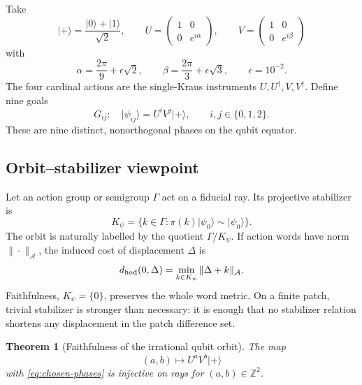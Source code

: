 \documentclass[11pt]{article}
\newtheorem{theorem}{Theorem}[section]
\theoremstyle{definition}
\theoremstyle{remark}
\newcommand{\Z}{\mathbb Z}
\newcommand{\ket}[1]{\lvert #1\rangle}
\begin{document}
Take
\begin{equation}
 \ket{+}=\frac{\ket0+\ket1}{\sqrt2},\qquad
 U=\begin{pmatrix}1&0\\0&e^{i\alpha}\end{pmatrix},\qquad
 V=\begin{pmatrix}1&0\\0&e^{i\beta}\end{pmatrix}
 \label{eq:qubit-controls}
\end{equation}
with
\begin{equation}
 \alpha=\frac{2\pi}{9}+\epsilon\sqrt2,\qquad
 \beta=\frac{2\pi}{3}+\epsilon\sqrt3,\qquad
 \epsilon=10^{-2}.
 \label{eq:chosen-phases}
\end{equation}
The four cardinal actions are the single-Kraus instruments
$U,U^\dagger,V,V^\dagger$. Define nine goals
\begin{equation}
 G_{ij}:\quad
 \ket{\psi_{ij}}=U^iV^j\ket+,\qquad i,j\in\{0,1,2\}.
 \label{eq:nine-qubit-goals}
\end{equation}
These are nine distinct, nonorthogonal phases on the qubit equator.

\subsection{Orbit--stabilizer viewpoint}

Let an action group or semigroup $\Gamma$ act on a fiducial ray. Its
projective stabilizer is
\begin{equation}
 K_\psi=\{k\in\Gamma:\pi(k)\ket{\psi_0}\sim\ket{\psi_0}\}.
 \label{eq:stabilizer}
\end{equation}
The orbit is naturally labelled by the quotient $\Gamma/K_\psi$. If action
words have norm $\|\cdot\|_{\mathcal A}$, the induced cost of displacement
$\Delta$ is
\begin{equation}
 d_{\rm hod}(0,\Delta)
 =\min_{k\in K_\psi}\|\Delta+k\|_{\mathcal A}.
 \label{eq:quotient-metric}
\end{equation}
Faithfulness, $K_\psi=\{0\}$, preserves the whole word metric. On a finite
patch, trivial stabilizer is stronger than necessary: it is enough that no
stabilizer relation shortens any displacement in the patch difference set.

\begin{theorem}[Faithfulness of the irrational qubit orbit]
\label{thm:qubit-faithful}
The map
\begin{equation}
 (a,b)\longmapsto U^aV^b\ket+
\end{equation}
with \cref{eq:chosen-phases} is injective on rays for $(a,b)\in\Z^2$.
\end{theorem}
\end{document}
